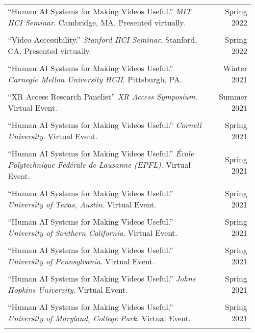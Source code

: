 \begin{longtable}{Xr}
	``Human AI Systems for Making Videos Useful.'' \textit{MIT HCI Seminar}. Cambridge, MA. Presented virtually. & Spring 2022 \\
	\\

	``Video Accessibility.'' \textit{Stanford HCI Seminar}. Stanford, CA. Presented virtually. & Spring 2022 \\
	\\

	``Human AI Systems for Making Videos Useful.'' \textit{Carnegie Mellon University HCII}. Pittsburgh, PA. & Winter 2021 \\
	\\

	``XR Access Research Panelist'' \textit{XR Access Symposium}. Virtual Event. & Summer 2021 \\
	\\

	``Human AI Systems for Making Videos Useful.'' \textit{Cornell University}. Virtual Event. & Spring 2021 \\
	\\

	``Human AI Systems for Making Videos Useful.'' \textit{École Polytechnique Fédérale de Lausanne (EPFL)}. Virtual Event. & Spring 2021 \\
	\\

	``Human AI Systems for Making Videos Useful.'' \textit{University of Texas, Austin}. Virtual Event. & Spring 2021 \\
	\\

	``Human AI Systems for Making Videos Useful.'' \textit{University of Southern California}. Virtual Event. & Spring 2021 \\
	\\

	``Human AI Systems for Making Videos Useful.'' \textit{University of Pennsylvania}. Virtual Event. & Spring 2021 \\
	\\

	``Human AI Systems for Making Videos Useful.'' \textit{Johns Hopkins University}. Virtual Event. & Spring 2021 \\
	\\

	``Human AI Systems for Making Videos Useful.'' \textit{University of Maryland, College Park}. Virtual Event. & Spring 2021 \\
	\\


\end{longtable}
